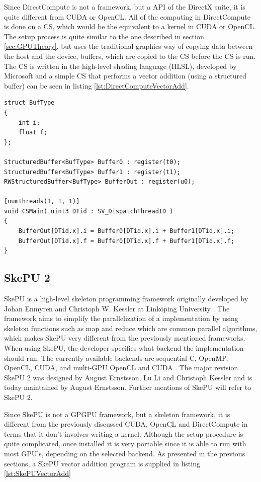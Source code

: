 Since DirectCompute is not a framework, but a API of the DirectX suite, it is quite different from CUDA or OpenCL. All of the computing in DirectCompute is done on a CS, which would be the equivalent to a kernel in CUDA or OpenCL. The setup process is quite similar to the one described in section \ref{sec:GPUTheory}, but uses the traditional graphics way of copying data between the host and the device, buffers, which are copied to the CS before the CS is run. The CS is written in the high-level shading language (HLSL), developed by Microsoft and a simple CS that performs a vector addition (using a structured buffer) can be seen in listing \ref{lst:DirectComputeVectorAdd}.

\begin{lstlisting}[caption={DirectCompute vector addition CS}, label={lst:DirectComputeVectorAdd}, frame=single] 
struct BufType
{
    int i;
    float f; 
};

StructuredBuffer<BufType> Buffer0 : register(t0);
StructuredBuffer<BufType> Buffer1 : register(t1);
RWStructuredBuffer<BufType> BufferOut : register(u0);

[numthreads(1, 1, 1)]
void CSMain( uint3 DTid : SV_DispatchThreadID )
{
    BufferOut[DTid.x].i = Buffer0[DTid.x].i + Buffer1[DTid.x].i;
    BufferOut[DTid.x].f = Buffer0[DTid.x].f + Buffer1[DTid.x].f;
}

\end{lstlisting}



\subsection{SkePU 2}
SkePU is a high-level skeleton programming framework originally developed by Johan Enmyren and Christoph W. Kessler at Linköping University \cite{enmyren2010skepu}. The framework aims to simplify the parallelization of a implementation by using skeleton functions such as map and reduce which are common parallel algorithms, which makes SkePU very different from the previously mentioned frameworks. When using SkePU, the developer specifies what backend the implementation should run. The currently available backends are sequential C, OpenMP, OpenCL, CUDA, and multi-GPU OpenCL and CUDA \cite{LiUSkePU}. The major revision SkePU 2 was designed by August Ernstsson, Lu Li and Christoph Kessler and is today maintained by August Ernstsson. Further mentions of SkePU will refer to SkePU 2.

Since SkePU is not a GPGPU framework, but a skeleton framework, it is different from the previously discussed CUDA, OpenCL and DirectCompute in terms that it don't involves writing a kernel. Although the setup procedure is quite complicated, once installed it is very portable since it is able to run with most GPU's, depending on the selected backend. As presented in the previous sections, a SkePU vector addition program is supplied in listing \ref{lst:SkePUVectorAdd}

